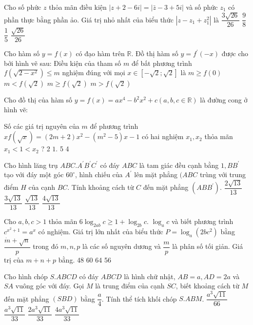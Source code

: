\begin{ex}
 Cho số phức $z$ thỏa mãn điều kiện $|z+2-6 i|=|\bar{z}-3+5 i|$ và số phức $z_{1}$ có phần thực bằng phần ảo. Giá trị nhỏ nhất của biểu thức $\left|z-z_{1}+z_{1}^{2}\right|$ là
\choice
{$\dfrac{3 \sqrt{26}}{26}$}
{$\dfrac{9}{8}$}
{$\dfrac{1}{5}$}
{$\dfrac{\sqrt{26}}{26}$}
\end{ex}

\begin{ex}
 Cho hàm số $y=f(x)$ có đạo hàm trên $\mathbb{R}$. Đồ thị hàm số $y=f^{\prime}(-x)$ được cho bởi hình vẽ sau:
Điều kiện của tham số $m$ để bất phương trình $f\left(\sqrt{2-x^{2}}\right) \leq m$ nghiệm đúng với mọi $x \in[-\sqrt{2}; \sqrt{2}]$ là
\choice
{$m \geq f(0)$}
{$m<f(\sqrt{2})$}
{$m \geq f(\sqrt{2})$}
{$m>f(\sqrt{2})$}
\end{ex}

\begin{ex}
 Cho đồ thị của hàm số $y=f(x)=a x^{4}-b^{2} x^{2}+c(a, b, c \in \mathbb{R})$ là đường cong ở hình vẽ:

Số các giá trị nguyên của $m$ để phương trình $x f(\sqrt{x})=(2 m+2) x^{2}-\left(m^{2}-5\right) x-1$ có hai nghiệm $x_{1}, x_{2}$ thỏa mãn $x_{1}<1<x_{2}$ ?
\choice
{2}
{$1.$}
{5}
{4}
\end{ex}

\begin{ex}
 Cho hình lăng trụ $A BC.A^{\prime} B^{\prime} C^{\prime}$ có đáy $A B C$ là tam giác đều cạnh bằng $1, B B^{\prime}$ tạo với đáy một góc $60^{\circ}$, hình chiếu của $A^{\prime}$ lên mặt phẳng $(A B C$ trùng với trung điểm $H$ của cạnh $B C$. Tính khoảng cách từ $C$ đến mặt phẳng $\left(A B B^{\prime}\right)$.
\choice
{$\dfrac{2 \sqrt{13}}{13}$}
{$\dfrac{3 \sqrt{13}}{13}$}
{$\dfrac{\sqrt{13}}{13}$}
{$\dfrac{4 \sqrt{13}}{13}$}
\end{ex}

\begin{ex}
 Cho $a, b, c>1$ thỏa mãn $6 \log _{2 a b} c \geq 1+\log _{2 b} c$. $\log _{a} c$ và biết phương trình $c^{x^{2}+1}=a^{x}$ có nghiệm. Giá trị lớn nhất của biểu thức $P=\log _{a}\left(2 b c^{2}\right)$ bằng $\dfrac{\dot{m}+\sqrt{n}}{p}$ trong đó $m, n, p$ là các số nguyên dương và $\dfrac{m}{p}$ là phân số tối giản. Giá trị của $m+n+p$ bằng.
\choice
{48}
{60}
{64}
{56}
\end{ex}

\begin{ex}
 Cho hình chóp $S. A B C D$ có đáy $A B C D$ là hình chữ nhật, $A B=a, A D=2 a$ và $S A$ vuông góc với đáy. Gọi $M$ là trung điểm của cạnh $S C$, biết khoảng cách từ $M$ đến mặt phẳng $(SBD)$ bằng $\dfrac{a}{4}$. Tính thể tích khối chóp  $S.A B M$.
\choice
{$\dfrac{a^{3} \sqrt{11}}{66}$}
{$\dfrac{a^{3} \sqrt{11}}{33}$}
{$\dfrac{2 a^{3} \sqrt{11}}{33}$}
{$\dfrac{4 a^{3} \sqrt{11}}{33}$}
\end{ex}

